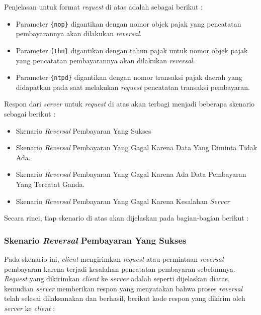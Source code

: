 \documentclass[pdftex,12pt, oneside]{article}
\begin{document}
  Penjelasan untuk format \textit{request} di atas adalah sebagai berikut :
  
  \begin{itemize}
    \item Parameter \texttt{\{nop\}} digantikan dengan nomor objek pajak yang pencatatan pembayarannya akan dilakukan \textit{reversal}.
    \item Parameter \texttt{\{thn\}} digantikan dengan tahun pajak untuk nomor objek pajak yang pencatatan pembayarannya akan dilakukan \textit{reversal}.
    \item Parameter \texttt{\{ntpd\}} digantikan dengan nomor transaksi pajak daerah yang didapatkan pada saat melakukan \textit{request} pencatatan transaksi pembayaran.
  \end{itemize}
  
  Respon dari \textit{server} untuk \textit{request} di atas akan terbagi menjadi beberapa skenario sebagai berikut :
  
  \begin{itemize}
    \item Skenario \textit{Reversal} Pembayaran Yang Sukses
    \item Skenario \textit{Reversal} Pembayaran Yang Gagal Karena Data Yang Diminta Tidak Ada.
    \item Skenario \textit{Reversal} Pembayaran Yang Gagal Karena Ada Data Pembayaran Yang Tercatat Ganda.
    \item Skenario \textit{Reversal} Pembayaran Yang Gagal Karena Kesalahan \textit{Server}
  \end{itemize}
  
  Secara rinci, tiap skenario di atas akan dijelaskan pada bagian-bagian berikut :
  
  \subsubsection{Skenario \textit{Reversal} Pembayaran Yang Sukses}
  
  Pada skenario ini, \textit{client} mengirimkan \textit{request} atau permintaan \textit{reversal} pembayaran karena terjadi kesalahan pencatatan pembayaran sebelumnya. \textit{Request} yang dikirimkan \textit{client} ke \textit{server} adalah seperti dijelaskan diatas, kemudian \textit{server} memberikan respon yang menyatakan bahwa proses \textit{reversal} telah selesai dilaksanakan dan berhasil, berikut kode respon yang dikirim oleh \textit{server} ke \textit{client} :
  
\end{document}
